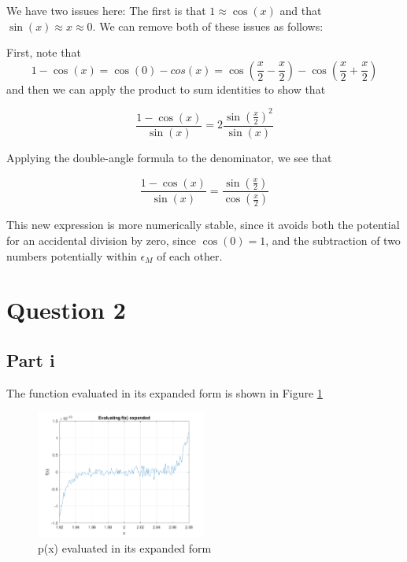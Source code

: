 \documentclass[12pt]{exam}
\begin{document}
We have two issues here: The first is that $1\approx \cos(x)$ and that $\sin(x)\approx x \approx 0$. We can remove both of these issues as follows:

First, note that
\begin{equation}
1-\cos(x) = \cos(0)-cos(x)=\cos\left(\frac{x}{2}-\frac{x}{2}\right)-\cos\left(\frac{x}{2}+\frac{x}{2}\right)
\end{equation}
and then we can apply the product to sum identities to show that 

\begin{equation}
\frac{1-\cos(x)}{\sin(x)} = 2\frac{\sin\left(\frac{x}{2}\right)^2}{\sin(x)}
\end{equation}

Applying the double-angle formula to the denominator, we see that 

\begin{equation}
\frac{1-\cos(x)}{\sin(x)} = \frac{\sin\left(\frac{x}{2}\right)}{\cos\left(\frac{x}{2}\right)}
\end{equation}

This new expression is more numerically stable, since it avoids both the potential for an accidental division by zero, since $\cos(0)=1$, and the subtraction of two numbers potentially within $\epsilon_M$ of each other. 
\newpage

\section*{Question 2}

\subsection*{Part i}
The function evaluated in its expanded form is shown in Figure \ref{fig:expanded}
\begin{figure}[h!]
\centering
\includegraphics[width=0.5\textwidth]{q2p1.png}
\caption{p(x) evaluated in its expanded form}\label{fig:expanded}
\end{figure}
\end{document}
